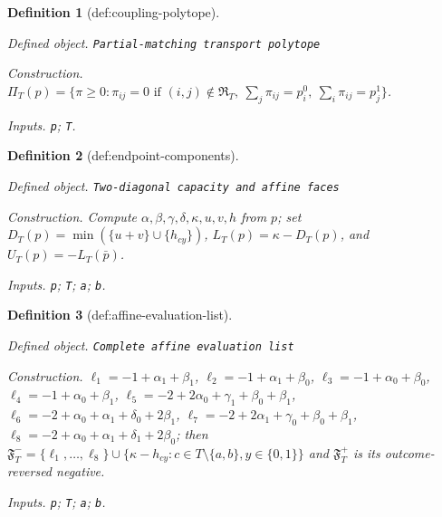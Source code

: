 \documentclass{article}
\newtheorem{definition}{Definition}
\begin{document}
\begin{definition}[def:coupling-polytope]\label{def:coupling-polytope}
\par\smallskip\noindent\emph{Defined object.} \texttt{Partial-\allowbreak{}matching transport polytope}
\par\smallskip\noindent\emph{Construction.} \(\Pi_T(p)=\{\pi\geq0:\pi_{ij}=0\text{ if }(i,j)\notin\mathfrak R_T,\ \sum_j\pi_{ij}=p^0_i,\ \sum_i\pi_{ij}=p^1_j\}\).
\par\smallskip\noindent\emph{Inputs.} \texttt{p}; \texttt{T}.
\end{definition}

\begin{definition}[def:endpoint-components]\label{def:endpoint-components}
\par\smallskip\noindent\emph{Defined object.} \texttt{Two-\allowbreak{}diagonal capacity and affine faces}
\par\smallskip\noindent\emph{Construction.} Compute \(\alpha,\beta,\gamma,\delta,\kappa,u,v,h\) from \(p\); set \(D_T(p)=\min(\{u+v\}\cup\{h_{cy}\})\), \(L_T(p)=\kappa-D_T(p)\), and \(U_T(p)=-L_T(\bar p)\).
\par\smallskip\noindent\emph{Inputs.} \texttt{p}; \texttt{T}; \texttt{a}; \texttt{b}.
\end{definition}

\begin{definition}[def:affine-evaluation-list]\label{def:affine-evaluation-list}
\par\smallskip\noindent\emph{Defined object.} \texttt{Complete affine evaluation list}
\par\smallskip\noindent\emph{Construction.} \(\ell_1=-1+\alpha_1+\beta_1\), \(\ell_2=-1+\alpha_1+\beta_0\), \(\ell_3=-1+\alpha_0+\beta_0\), \(\ell_4=-1+\alpha_0+\beta_1\), \(\ell_5=-2+2\alpha_0+\gamma_1+\beta_0+\beta_1\), \(\ell_6=-2+\alpha_0+\alpha_1+\delta_0+2\beta_1\), \(\ell_7=-2+2\alpha_1+\gamma_0+\beta_0+\beta_1\), \(\ell_8=-2+\alpha_0+\alpha_1+\delta_1+2\beta_0\); then \(\mathfrak F^-_T=\{\ell_1,\ldots,\ell_8\}\cup\{\kappa-h_{cy}:c\in T\setminus\{a,b\},y\in\{0,1\}\}\) and \(\mathfrak F^+_T\) is its outcome-reversed negative.
\par\smallskip\noindent\emph{Inputs.} \texttt{p}; \texttt{T}; \texttt{a}; \texttt{b}.
\end{definition}
\end{document}
